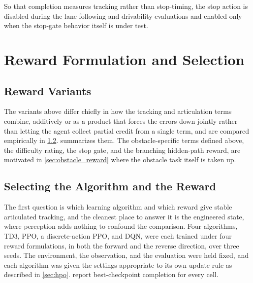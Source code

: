 So that completion measures tracking rather than stop-timing, the stop action is disabled during the lane-following and drivability evaluations and enabled only when the stop-gate behavior itself is under test.

\section{Reward Formulation and Selection}

\subsection{Reward Variants}


The variants above differ chiefly in how the tracking and articulation terms combine, additively or as a product that forces the errors down jointly rather than letting the agent collect partial credit from a single term, and are compared empirically in \cref{sec:algo_reward}.  summarizes them. The obstacle-specific terms defined above, the difficulty rating, the stop gate, and the branching hidden-path reward, are motivated in \cref{sec:obstacle_reward} where the obstacle task itself is taken up.



\subsection{Selecting the Algorithm and the Reward}
\label{sec:algo_reward}

The first question is which learning algorithm and which reward give stable articulated tracking, and the cleanest place to answer it is the engineered state, where perception adds nothing to confound the comparison. Four algorithms, TD3, PPO, a discrete-action PPO, and DQN, were each trained under four reward formulations, in both the forward and the reverse direction, over three seeds. The environment, the observation, and the evaluation were held fixed, and each algorithm was given the settings appropriate to its own update rule as described in \cref{sec:hpo}.  report best-checkpoint completion for every cell.

